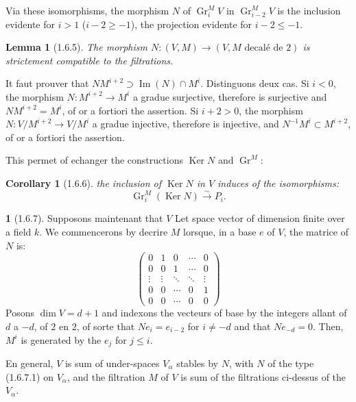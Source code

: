 \documentclass[12pt,a4paper]{article}
\theoremstyle{plain}
\newtheorem{lemma}[theorem]{Lemma}
\newtheorem{corollary}[theorem]{Corollary}
\theoremstyle{definition}
\theoremstyle{definition}
\newtheorem{para}{}[section]
\theoremstyle{remark}
\DeclareMathOperator{\Gr}{Gr}
\DeclareMathOperator{\Imm}{Im}
\DeclareMathOperator{\Ker}{Ker}
\begin{document}
Via these isomorphisms, the morphism $N$ of $\Gr_i^M V$ in $\Gr_{i-2}^M V$ is the inclusion evidente for $i > 1$ ($i-2 \geq -1$), the projection evidente for $i - 2 \leq -1$.

\begin{lemma}[1.6.5]
The morphism $N: (V, M) \to (V, M \text{ decal\'e de } 2)$ is strictement compatible to the filtrations.
\end{lemma}

It faut prouver that $NM^{i+2} \supset \Imm(N) \cap M^i$. Distinguons deux cas. Si $i < 0$, the morphism $N: M^{i+2} \to M^i$ a gradue surjective, therefore is surjective and $NM^{i+2} = M^i$, of or a fortiori the assertion. Si $i + 2 > 0$, the morphism $N: V/M^{i+2} \to V/M^i$ a gradue injective, therefore is injective, and $N^{-1} M^i \subset M^{i+2}$, of or a fortiori the assertion.

This permet of echanger the constructions $\Ker N$ and $\Gr^M$:

\begin{corollary}[1.6.6]
the inclusion of $\Ker N$ in $V$ induces of the isomorphisms:
\[\Gr_i^M(\Ker N) \xrightarrow{\sim} P_i.\]
\end{corollary}

\begin{para}[1.6.7]
Supposons maintenant that $V$ Let space vector of dimension finite over a field $k$. We commencerons by decrire $M$ lorsque, in a base $e$ of $V$, the matrice of $N$ is:
\begin{equation}\tag{1.6.7.1}
\begin{pmatrix}
0 & 1 & 0 & \cdots & 0 \\
0 & 0 & 1 & \cdots & 0 \\
\vdots & \vdots & \ddots & \ddots & \vdots \\
0 & 0 & \cdots & 0 & 1 \\
0 & 0 & \cdots & 0 & 0
\end{pmatrix}
\end{equation}
Posons $\dim V = d+1$ and indexons the vecteurs of base by the integers allant of $d$ a $-d$, of $2$ en $2$, of sorte that $Ne_i = e_{i-2}$ for $i \neq -d$ and that $Ne_{-d} = 0$. Then, $M^i$ is generated by the $e_j$ for $j \leq i$.

En general, $V$ is sum of under-spaces $V_\alpha$ stables by $N$, with $N$ of the type (1.6.7.1) on $V_\alpha$, and the filtration $M$ of $V$ is sum of the filtrations ci-dessus of the $V_\alpha$.
\end{para}
\end{document}
